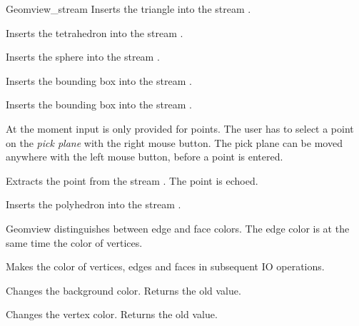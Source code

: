 \begin{ccClass}{Geomview_stream}
{Inserts the triangle  into the stream \ccVar.}


{Inserts the tetrahedron  into the stream \ccVar.}

{Inserts the sphere  into the stream \ccVar.}


{Inserts the bounding box  into the stream \ccVar.}

{Inserts the bounding box  into the stream \ccVar.}



At the moment input is only provided for points. The user has to select
a point on the {\it pick plane} with the right mouse button. The pick plane
can be moved anywhere with the left mouse button, before a point is entered.

{Extracts the point  from the stream \ccVar. The point is
 echoed.}




{Inserts the polyhedron  into the stream \ccVar.}


Geomview distinguishes between edge and face colors. The edge color
is at the same time the color of vertices. 

{Makes  the color of vertices, edges and faces in subsequent IO 
 operations.}

{Changes the background color. Returns the old value.}

{Changes the vertex color. Returns the old value.}


\end{ccClass}
